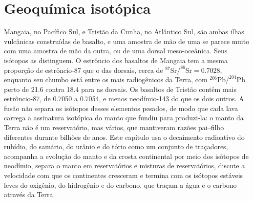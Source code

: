 \chapter{Geoquímica isotópica}\label{ch:b2:isotope-geochemistry}

Mangaia, no Pacífico Sul, e Tristão da Cunha, no Atlântico
Sul, são ambas ilhas vulcânicas construídas de basalto, e uma amostra de mão de
uma se parece muito com uma amostra de mão da outra, ou de uma dorsal meso-oceânica.
Seus isótopos as distinguem. O estrôncio dos basaltos de Mangaia tem
a mesma proporção de estrôncio-87 que o das dorsais, cerca de
$^{87}\mathrm{Sr}/^{86}\mathrm{Sr} = 0.7028$, enquanto seu chumbo está entre os mais
radiogênicos da Terra, com $^{206}\mathrm{Pb}/^{204}\mathrm{Pb}$ perto de 21.6 contra
18.4 para as dorsais. Os basaltos de Tristão contêm mais estrôncio-87, de 0.7050 a
0.7054, e menos neodímio-143 do que os dois outros. A fusão não separa os isótopos desses
elementos pesados, de modo que cada lava carrega a assinatura isotópica do
manto que fundiu para produzi-la: o manto da Terra não é um reservatório, mas
vários, que mantiveram razões pai--filho diferentes durante bilhões de
anos. Este capítulo usa o decaimento radioativo do rubídio, do samário, do urânio
e do tório como um conjunto de traçadores, acompanha a evolução do manto e da
crosta continental por meio dos isótopos de neodímio, separa o manto em
reservatórios e misturas de reservatórios, discute a velocidade com que os continentes cresceram
e termina com os isótopos estáveis leves do oxigênio, do hidrogênio e do carbono, que
traçam a água e o carbono através da Terra.

